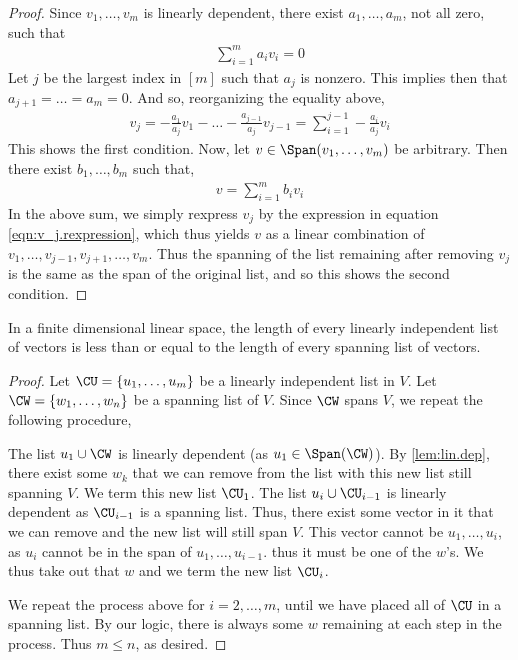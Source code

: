\documentclass{article}
\begin{document}
  \begin{proof}
    Since $v_1, \dots, v_m$ is linearly dependent, there exist $a_1, \dots, a_m$, not all zero, such that
    \begin{align*}
      \sum_{i = 1}^{m}a_iv_i = 0
    \end{align*}
    Let $j$ be the largest index in $[m]$ such that $a_j$ is nonzero. This implies then that $a_{j + 1} = \dots = a_{m} = 0$. And so, reorganizing the equality above,
    \begin{align}\label{eqn:v_j.rexpression}
      v_j = -\frac{a_1}{a_j}v_1 - \dots - \frac{a_{j - 1}}{a_j}v_{j - 1} = \sum_{i = 1}^{j - 1}-\frac{a_i}{a_j}v_i
    \end{align}
    This shows the first condition. Now, let $v \in \Span(v_1, \dots, v_m)$ be arbitrary. Then there exist $b_1, \dots, b_m$ such that,
    \begin{align*}
      v = \sum_{i = 1}^{m}b_iv_i
    \end{align*}
    In the above sum, we simply rexpress $v_j$ by the expression in equation \eqref{eqn:v_j.rexpression}, which thus yields $v$ as a linear combination of $v_1, \dots, v_{j -
    1}, v_{j + 1}, \dots, v_m$. Thus the spanning of the list remaining after removing $v_j$ is the same as the span of the original list, and so this shows the second
    condition.
  \end{proof}
  \begin{prop}\label{prop:lin.ind.less.span}
    In a finite dimensional linear space, the length of every linearly independent list of vectors is less than or equal to the length of every spanning list of vectors.
  \end{prop}
  \begin{proof}
    Let $\CU = \{u_1, \dots, u_m\}$ be a linearly independent list in $V$. Let $\CW = \{w_1, \dots, w_n\}$ be a spanning list of $V$. Since $\CW$ spans $V$, we repeat the
    following procedure,
    \begin{enumerate}[label=\roman*)]
      \ii The list $u_1 \cup \CW$ is linearly dependent (as $u_1 \in \Span(\CW)$). By \eqref{lem:lin.dep}, there exist some $w_k$ that we can remove from the list with
      this new list still spanning $V$. We term this new list $\CU_1$.
      \ii The list $u_i \cup \CU_{i - 1}$ is linearly dependent as $\CU_{i - 1}$ is a spanning list. Thus, there exist some vector in it that we can remove and the new list
      will still span $V$. This vector cannot be $u_1, \dots, u_i$, as $u_i$ cannot be in the span of $u_1, \dots, u_{i - 1}$. thus it must be one of the $w$'s. We thus take
      out that $w$ and we term the new list $\CU_{i}$.
    \end{enumerate}
    We repeat the process above for $i = 2, \dots, m$, until we have placed all of $\CU$ in a spanning list. By our logic, there is always some $w$ remaining at each step in
    the process. Thus $m \leq n$, as desired.
  \end{proof}
\end{document}
